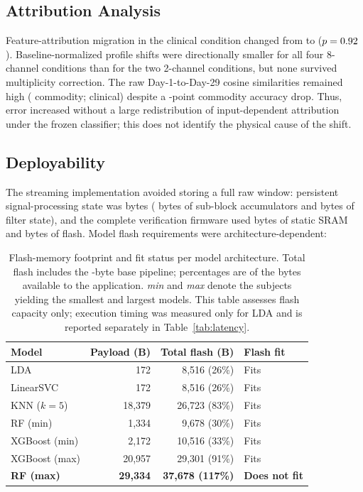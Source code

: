 \documentclass[preprint,12pt]{elsarticle}
\begin{document}
\subsection{Attribution Analysis}
Feature-attribution migration in the clinical condition changed from \shapMigrationDayOne{} to \shapMigrationDayTwentyNine{} ($p=0.92{}$). Baseline-normalized profile shifts were directionally smaller for all four 8-channel conditions than for the two 2-channel conditions, but none survived multiplicity correction. The raw Day-1-to-Day-29 cosine similarities remained high (\shapCosineCommodity{} commodity; \shapCosineClinical{} clinical) despite a \rfCommDrop{}-point commodity accuracy drop. Thus, error increased without a large redistribution of input-dependent attribution under the frozen classifier; this does not identify the physical cause of the shift.

\subsection{Deployability}\label{sec:deploy_results}
The streaming implementation avoided storing a full raw window: persistent signal-processing state was \dspStateBytes{} bytes (\accumBytesMeasured{} bytes of sub-block accumulators and \filterStateBytes{} bytes of filter state), and the complete verification firmware used \verifySRAM{} bytes of static SRAM and \verifyFlash{} bytes of flash. Model flash requirements were architecture-dependent:

\begin{table}[htbp]
    \centering
    \caption{Flash-memory footprint and fit status per model architecture. Total flash includes the \measuredFlash{}-byte base pipeline; percentages are of the \appFlashLimit{} bytes available to the application. \emph{min} and \emph{max} denote the subjects yielding the smallest and largest models. This table assesses flash capacity only; execution timing was measured only for LDA and is reported separately in Table~\ref{tab:latency}.}
    \label{tab:memory}
    \begin{tabular}{lrrl}
        \toprule
        \textbf{Model} & \textbf{Payload (B)} & \textbf{Total flash (B)} & \textbf{Flash fit} \\
        \midrule
        LDA               & 172    & 8,516 (26\%)   & Fits \\
        LinearSVC         & 172    & 8,516 (26\%)   & Fits \\
        KNN ($k=5$)       & 18,379 & 26,723 (83\%)  & Fits \\
        RF (min)          & 1,334  & 9,678 (30\%)   & Fits \\
        XGBoost (min)     & 2,172  & 10,516 (33\%)  & Fits \\
        XGBoost (max)     & 20,957 & 29,301 (91\%)  & Fits \\
        \textbf{RF (max)} & \textbf{29,334} & \textbf{37,678 (117\%)} & \textbf{Does not fit} \\
        \bottomrule
    \end{tabular}
\end{table}
\end{document}
